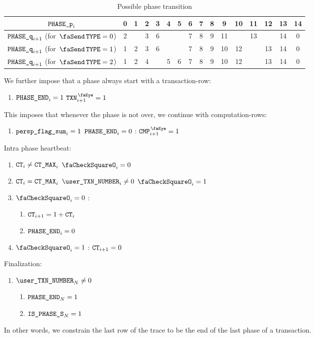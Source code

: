 \begin{table}[h]
    \centering
    \begin{tabular}{|c|c|c|c|c|c|c|c|c|c|c|c|c|c|c|c|} \hline
        $\texttt{PHASE\_p}_{i}$                         & 0 & 1 & 2 & 3 & 4 & 5 & 6 & 7 & 8 & 9  & 10 & 11 & 12 & 13 & 14 \\ \hline \hline
        $\texttt{PHASE\_q}_{i + 1}$ (for $\txType = 0$) & 2 &   & 3 & 6 &   &   & 7 & 8 & 9 & 11 &    & 13 &    & 14 & 0  \\ \hline
        $\texttt{PHASE\_q}_{i + 1}$ (for $\txType = 1$) & 1 & 2 & 3 & 6 &   &   & 7 & 8 & 9 & 10 & 12 &    & 13 & 14 & 0  \\ \hline
        $\texttt{PHASE\_q}_{i + 1}$ (for $\txType = 2$) & 1 & 2 & 4 &   & 5 & 6 & 7 & 8 & 9 & 10 & 12 &    & 13 & 14 & 0  \\ \hline
    \end{tabular}
    \caption{Possible phase transition}
    \label{tab:Possible phase transition}
\end{table}

We further impose that a phase always start with a transaction-row:
\begin{enumerate}[resume]
    \item $\texttt{PHASE\_END}_{i} = 1$ \Then $\isTxn_{i+1} = 1$
\end{enumerate}
This imposes that whenever the phase is not over, we continue with computation-rows:
\begin{enumerate}[resume]
    \item \If $\texttt{persp\_flag\_sum}_{i} =1$ \et $\texttt{PHASE\_END}_{i} = 0$ \Then: $\isCmp_{i+1} = 1$
\end{enumerate}

Intra phase heartbeat:
\begin{enumerate}[resume]
    \item \If $\texttt{CT}_{i} \neq \texttt{CT\_MAX}_{i}$ \Then $\done_{i} = 0$
    \item \If $\texttt{CT}_{i} =    \texttt{CT\_MAX}_{i}$ \et $\userTransactionNumber_{i} \neq 0$ \Then $\done_{i} = 1$
    \item \If $\done_{i} = 0$ \Then:
    \begin{enumerate}
        \item $\texttt{CT}_{i+1} = 1 + \texttt{CT}_{i}$ 
        \item $\texttt{PHASE\_END}_{i} = 0$
    \end{enumerate}
    \item \If $\done_{i} = 1$ \Then: $\texttt{CT}_{i+1} = 0$
\end{enumerate}

Finalization:
\begin{enumerate}[resume]
    \item \If $\userTransactionNumber_{N} \neq 0$ \Then
    \begin{enumerate}
        \item $\texttt{PHASE\_END}_{N} = 1$
        \item $\texttt{IS\_PHASE\_S}_{N} = 1$ 
    \end{enumerate}
\end{enumerate}
In other words, we constrain the last row of the trace to be the end of the last phase of a transaction.
